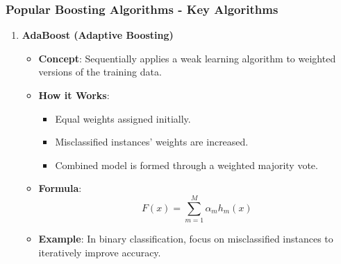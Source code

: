 \documentclass[aspectratio=169]{beamer}
\begin{document}
\begin{frame}[fragile]
    \frametitle{Popular Boosting Algorithms - Key Algorithms}
    \begin{enumerate}
        \item \textbf{AdaBoost (Adaptive Boosting)}
            \begin{itemize}
                \item \textbf{Concept}: Sequentially applies a weak learning algorithm to weighted versions of the training data.
                \item \textbf{How it Works}:
                    \begin{itemize}
                        \item Equal weights assigned initially.
                        \item Misclassified instances' weights are increased.
                        \item Combined model is formed through a weighted majority vote.
                    \end{itemize}
                \item \textbf{Formula}:
                    \begin{equation}
                    F(x) = \sum_{m=1}^{M} \alpha_m h_m(x)
                    \end{equation}
                \item \textbf{Example}: In binary classification, focus on misclassified instances to iteratively improve accuracy.
            \end{itemize}
    \end{enumerate}
\end{frame}
\end{document}
